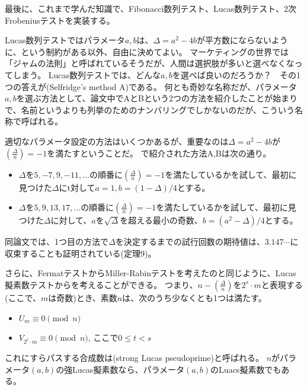 最後に、これまで学んだ知識で、Fibonacci数列テスト、Lucas数列テスト、2次Frobeniusテストを実装する。


Lucas数列テストではパラメータ$a,b$は、$\Delta=a^2-4b$が平方数にならないように、という制約がある以外、自由に決めてよい。
マーケティングの世界では「ジャムの法則」と呼ばれているそうだが、人間は選択肢が多いと選べなくなってしまう。
Lucas数列テストでは、どんな$a,b$を選べば良いのだろうか？　その1つの答えが(Selfridge's method A)\cite{selfridge_method}である。
何とも奇妙な名称だが、パラメータ$a,b$を選ぶ方法として、論文中でAとBという2つの方法を紹介したことが始まりで、名前というよりも列挙のためのナンバリングでしかないのだが、こういう名称で呼ばれる。

適切なパラメータ設定の方法はいくつかあるが、重要なのは$\Delta=a^2-4b$が$\left(\frac{\Delta}{n}\right)=-1$を満たすということだ。
\cite{selfridge_method}で紹介された方法A,Bは次の通り。
\begin{itemize}
 \item $\Delta$を$5,-7,9,-11,\ldots$の順番に$\left(\frac{\Delta}{n}\right)=-1$を満たしているかを試して、最初に見つけた$\Delta$にt対して$a=1,b=(1-\Delta)/4$とする。
 \item $\Delta$を$5,9,13,17,\ldots$の順番に$\left(\frac{\Delta}{n}\right)=-1$を満たしているかを試して、最初に見つけた$\Delta$に対して、$a$を$\sqrt{\Delta}$を超える最小の奇数、$b=(a^2-\Delta)/4$とする。
\end{itemize}
同論文では、1つ目の方法で$\Delta$を決定するまでの試行回数の期待値は、$3.147\cdots$に収束することも証明されている(\cite{selfridge_method}定理9)。


さらに、FermatテストからMiller-Rabinテストを考えたのと同じように、Lucas擬素数テストからを考えることができる。
つまり、$n - \left(\frac{\Delta}{n}\right)$を$2^s\cdot m$と表現する(ここで、$m$は奇数)とき、素数$n$は、次のうち少なくとも1つは満たす。
\begin{itemize}
 \item $U_m \equiv 0 \pmod{n}$
 \item $V_{2^t\cdot m} \equiv 0 \pmod{n}$, ここで$0\le t<s$
\end{itemize}
これにすらパスする合成数は(strong Lucas pseudoprime)と呼ばれる。
$n$がパラメータ$(a,b)$の強Lucas擬素数なら、パラメータ$(a,b)$のLuacs擬素数でもある。

